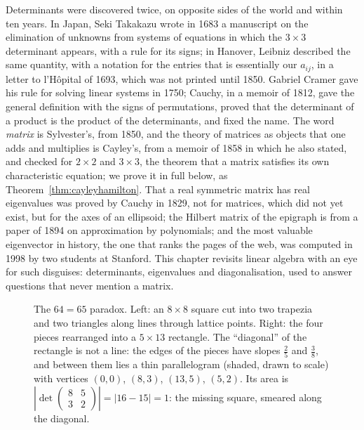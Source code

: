 Determinants were discovered twice, on opposite sides of the world and within ten years. In Japan, Seki Takakazu wrote in 1683 a manuscript on the
elimination of unknowns from systems of equations in which the $3\times3$ determinant appears, with a rule for its signs; in Hanover, Leibniz
described the same quantity, with a notation for the entries that is essentially our $a_{ij}$, in a letter to l'H\^opital of 1693, which was not
printed until 1850. Gabriel Cramer gave his rule for solving linear systems in 1750; Cauchy, in a memoir of 1812, gave the general definition with the
signs of permutations, proved that the determinant of a product is the product of the determinants, and fixed the name. The word \emph{matrix} is
Sylvester's, from 1850, and the theory of matrices as objects that one adds and multiplies is Cayley's, from a memoir of 1858 in which he also stated,
and checked for $2\times2$ and $3\times3$, the theorem that a matrix satisfies its own characteristic equation; we prove it in full below, as
Theorem~\ref{thm:cayleyhamilton}. That a real symmetric matrix has real eigenvalues was proved by Cauchy in 1829, not for matrices, which did not yet
exist, but for the axes of an ellipsoid; the Hilbert matrix of the epigraph is from a paper of 1894 on approximation by polynomials; and the most
valuable eigenvector in history, the one that ranks the pages of the web, was computed in 1998 by two students at Stanford. This chapter revisits
linear algebra with an eye for such disguises: determinants, eigenvalues and diagonalisation, used to answer questions that never mention a matrix.

\begin{figure}[ht]
\centering
{}
\caption{The $64=65$ paradox. Left: an $8\times8$ square cut into two trapezia and two triangles along lines through lattice points. Right: the four pieces rearranged into a $5\times13$ rectangle. The ``diagonal'' of the rectangle is not a line: the edges of the pieces have slopes $\frac25$ and $\frac38$, and between them lies a thin parallelogram (shaded, drawn to scale) with vertices $(0,0)$, $(8,3)$, $(13,5)$, $(5,2)$. Its area is $\left|\det\begin{pmatrix}8&5\\3&2\end{pmatrix}\right|=|16-15|=1$: the missing square, smeared along the diagonal.}
\label{fig:chessboard}
\end{figure}


